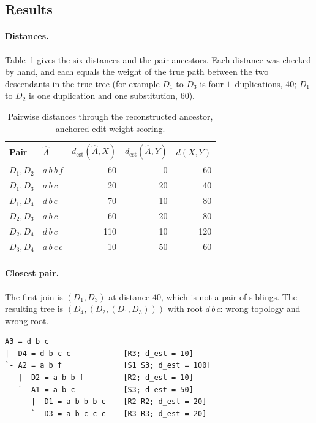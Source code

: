 \documentclass[11pt,a4paper]{article}
\newcommand{\Ahat}{\widehat{A}}
\newcommand{\dest}[2]{d_{\mathrm{est}}(#1,#2)}
\begin{document}
\subsection{Results}
\paragraph{Distances.} Table~\ref{tab:dist} gives the six distances and the pair ancestors. Each
distance was checked by hand, and each equals the weight of the true path between the two
descendants in the true tree (for example $D_1$ to $D_3$ is four $1$--duplications, $40$;
$D_1$ to $D_2$ is one duplication and one substitution, $60$).

\begin{table}[h]
\centering
\caption{Pairwise distances through the reconstructed ancestor, anchored edit-weight scoring.}
\label{tab:dist}
\begin{tabular}{llrrr}
\hline\hline
Pair & $\Ahat$ & $\dest{\Ahat}{X}$ & $\dest{\Ahat}{Y}$ & $d(X,Y)$ \\ \hline
$D_1,D_2$ & $a\,b\,b\,f$ & 60 & 0 & 60 \\
$D_1,D_3$ & $a\,b\,c$ & 20 & 20 & 40 \\
$D_1,D_4$ & $d\,b\,c$ & 70 & 10 & 80 \\
$D_2,D_3$ & $a\,b\,c$ & 60 & 20 & 80 \\
$D_2,D_4$ & $d\,b\,c$ & 110 & 10 & 120 \\
$D_3,D_4$ & $a\,b\,c\,c$ & 10 & 50 & 60 \\ \hline\hline
\end{tabular}
\end{table}

\paragraph{Closest pair.} The first join is $(D_1,D_3)$ at distance $40$, which is not a pair of
siblings. The resulting tree is $(D_4,(D_2,(D_1,D_3)))$ with root $d\,b\,c$: wrong topology and
wrong root.
\begin{lstlisting}
A3 = d b c
|- D4 = d b c c            [R3; d_est = 10]
`- A2 = a b f              [S1 S3; d_est = 100]
   |- D2 = a b b f         [R2; d_est = 10]
   `- A1 = a b c           [S3; d_est = 50]
      |- D1 = a b b b c    [R2 R2; d_est = 20]
      `- D3 = a b c c c    [R3 R3; d_est = 20]
\end{lstlisting}
\end{document}
